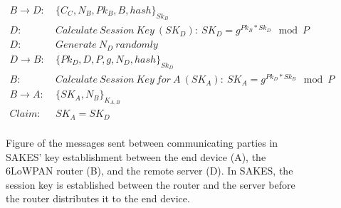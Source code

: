 \begin{figure}[h]
\begin{tcolorbox}[title=Key Establishment in SAKES]
\begin{align*}
B \rightarrow D:\ & \{C_C, N_B, Pk_B, B, hash\}_{Sk_B} \\
D:\ & Calculate\ Session\ Key\ (SK_D):\ SK_D = g^{Pk_B * Sk_D} \mod{P}\\
D:\ & Generate\ N_D\ randomly\\
D \rightarrow B:\ & \{Pk_D, D, P, g, N_D, hash\}_{Sk_D}\\
B:\ & Calculate\ Session\ Key\ for\ A\ (SK_A):\ SK_A = g^{Pk_D * Sk_B} \mod{P}\\
B \rightarrow A:\ & \{SK_A, N_B\}_{K_{A,B}}\\
Claim:\ & SK_A = SK_D\\
\end{align*}
\end{tcolorbox}
\caption[Figure of the messages sent between communicating parties in SAKES' key establishment between the end device, the 6LoWPAN router, and the remote server.]{Figure of the messages sent between communicating parties in SAKES' key establishment between the end device (A), the 6LoWPAN router (B), and the remote server (D). In SAKES, the session key is established between the router and the server before the router distributes it to the end device.}
\label{fig:sakes-keys}
\end{figure}

